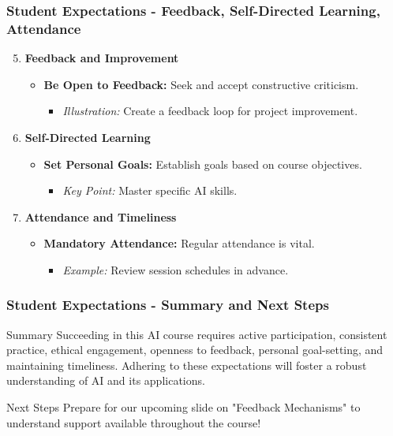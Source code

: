 \documentclass[aspectratio=169]{beamer}
\begin{document}
\begin{frame}[fragile]
    \frametitle{Student Expectations - Feedback, Self-Directed Learning, Attendance}
    \begin{enumerate}
        \setcounter{enumi}{4}  %
        \item \textbf{Feedback and Improvement}
        \begin{itemize}
            \item \textbf{Be Open to Feedback:} Seek and accept constructive criticism.
            \begin{itemize}
                \item \textit{Illustration:} Create a feedback loop for project improvement.
            \end{itemize}
        \end{itemize}
        
        \item \textbf{Self-Directed Learning}
        \begin{itemize}
            \item \textbf{Set Personal Goals:} Establish goals based on course objectives.
            \begin{itemize}
                \item \textit{Key Point:} Master specific AI skills.
            \end{itemize}
        \end{itemize}
        
        \item \textbf{Attendance and Timeliness}
        \begin{itemize}
            \item \textbf{Mandatory Attendance:} Regular attendance is vital.
            \begin{itemize}
                \item \textit{Example:} Review session schedules in advance.
            \end{itemize}
        \end{itemize}
    \end{enumerate}
\end{frame}

\begin{frame}[fragile]
    \frametitle{Student Expectations - Summary and Next Steps}
    \begin{block}{Summary}
        Succeeding in this AI course requires active participation, consistent practice, ethical engagement, openness to feedback, personal goal-setting, and maintaining timeliness. Adhering to these expectations will foster a robust understanding of AI and its applications.
    \end{block}
    \begin{block}{Next Steps}
        Prepare for our upcoming slide on "Feedback Mechanisms" to understand support available throughout the course!
    \end{block}
\end{frame}
\end{document}
